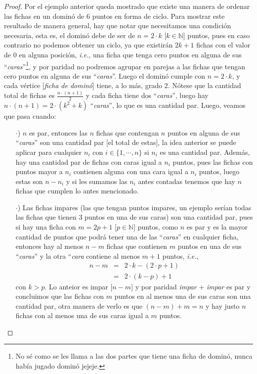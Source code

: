 \documentclass{article}
\begin{document}
\begin{enumerate}
\begin{proof}
    Por el ejemplo anterior queda mostrado que existe una manera de ordenar
    las fichas en un dominó de $6$ puntos en forma de ciclo. Para mostrar
    este resultado de manera general, hay que notar que necesitamos una
    condición necesaria, esta es, el dominó debe de ser de $n = 2 \cdot k$
    [$k \in \mathbb{N}$] puntos, pues en caso contrario no podemos obtener
    un ciclo, ya que existirán $2k +1$ fichas con el valor de $0$ en alguna
    posición, \textit{i.e.}, una ficha que tenga cero puntos en alguna de
    sus ``\textit{caras}''\footnote{No sé como se les llama a las dos partes
      que tiene una ficha de dominó, nunca había jugado dominó jejeje.}, y por
    paridad no podremos agrupar en parejas a las fichas que tengan cero puntos
    en alguna de sus ``\textit{caras}''. Luego el dominó cumple con
    $n = 2 \cdot k$, y cada vértice [\textit{ficha de dominó}] tiene, a lo
    más, grado $2$. Nótese que la cantidad total de fichas es $\frac{n \cdot (n +1)}{2}$
    y cada ficha tiene dos ``\textit{caras}'', luego hay
    $n \cdot (n +1) = 2 \cdot (k^2 + k)$ ``\textit{caras}'', lo que es una cantidad
    par. Luego, veamos que pasa cuando:
    \begin{itemize}
    \item[$\cdot$)] $n$ es par, entonces las $n$ fichas que contengan $n$ puntos en
      alguna de sus ``\textit{caras}'' son una cantidad par [el total de estas], la idea
      anterior se puede aplicar para cualquier $n_i$ con $i \in \{1, \dotsm, n\}$ si $n_i$
      es una cantidad par. Además, hay una cantidad par de fichas con caras igual a $n_i$
      puntos, pues las fichas con puntos mayor a $n_i$ contienen alguna con una cara igual
      a $n_i$ puntos, luego estas son $n - n_i$ y si les sumamos las $n_i$ antes contadas
      tenemos que hay $n$ fichas que cumplen lo antes mencionado.
      
    \item[$\cdot$)] Las fichas impares (las que tengan puntos impares, un ejemplo serían
      todas las fichas que tienen $3$ puntos en una de sus caras) son una cantidad par, pues
      si hay una ficha con $m = 2p +1$ [$p \in \mathbb{N}$] puntos, como $n$ es par y es la
      mayor cantidad de puntos que podrá tener una de las ``\textit{caras}'' en cualquier ficha,
      entonces hay al menos $n -m$ fichas que contienen $m$ puntos en una de sus ``\textit{caras}''
      y la otra ``\textit{cara} contiene al menos $m +1$ puntos, \textit{i.e.},
      \begin{eqnarray*}
        n - m &=& 2 \cdot k - (2 \cdot p +1)\\
        &=& 2 \cdot (k - p) + 1
      \end{eqnarray*}
      con $k > p$. Lo anteior es impar [$n -m$] y por paridad \textit{impar} $+$ \textit{impar}
      es par y concluimos que las fichas con $m$ puntos en al menos una de sus caras son una cantidad
      par, otra manera de verlo es que $(n -m) + m = n$ y hay justo $n$ fichas con al menos una de
      sus caras igual a $m$ puntos.
    \end{itemize}
    

\end{proof}
\end{enumerate}
\end{document}
